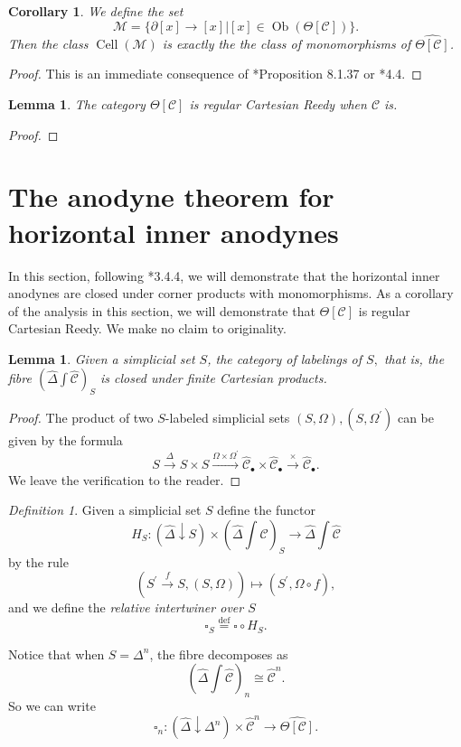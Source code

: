 \documentclass{amsart}
\numberwithin{equation}{section}
\theoremstyle{plain}   %
\newtheorem{cor}[subsection]{Corollary}
\newtheorem{lemma}[subsection]{Lemma}
\theoremstyle{remark}
\newtheorem{defn}[subsection]{Definition}
\theoremstyle{plain}
\DeclareMathOperator{\Ob}{Ob}
\newcommand{\overcat}[2]{{\left(#1\downarrow #2\right)}}
\newcommand{\psh}[1]{\ensuremath{\widehat{#1}}}
\newcommand{\C}{\ensuremath{\mathcal{C}}}
\newcommand{\defeq}{\overset{\mathrm{def}}=}
\newcommand{\cellset}{\ensuremath{\widehat{\Theta[\mathcal{C}]}}}
\newcommand{\ssetlab}{\ensuremath{\widehat{\Delta} \int \widehat{\mathcal{C}}}}
\begin{document}
\begin{cor} 
	We define the set
	\[\mathscr{M}=\{\partial[x] \to [x]| [x]\in \Ob(\Theta[\C])\}.\]  Then the class \(\operatorname{Cell}(\mathscr{M})\) is exactly the the class of monomorphisms of \(\cellset\).  
\end{cor}
\begin{proof}
	This is an immediate consequence of \cite{cisinski-book}*{Proposition 8.1.37} or \cite{bergner-rezk-reedy}*{4.4}.
\end{proof}
\begin{lemma} The category \(\Theta[\C]\) is regular Cartesian Reedy when \(\C\) is.
\end{lemma}
\begin{proof}
\end{proof}

\section{The anodyne theorem for horizontal inner anodynes}\label{horizontal}
In this section, following \cite{oury}*{3.4.4}, we will demonstrate that the horizontal inner anodynes are closed under corner products with monomorphisms.  As a corollary of the analysis in this section, we will demonstrate that \(\Theta[\C]\) is regular Cartesian Reedy.  We make no claim to originality.

\begin{lemma} Given a simplicial set \(S\), the category of labelings of \(S,\) that is, the fibre \(\left(\ssetlab\right)_S\) is closed under finite Cartesian products. 
\end{lemma}
\begin{proof} The product of two \(S\)-labeled simplicial sets \((S,\Omega), (S,\Omega^\prime)\) can be given by the formula 
	\[S\xrightarrow{\Delta} S\times S \xrightarrow{\Omega\times \Omega^\prime}  \psh{\C}_\bullet \times \psh{\C}_\bullet \xrightarrow{\times} \psh{\C}_\bullet.\]  We leave the verification to the reader.
\end{proof}

\begin{defn} Given a simplicial set \(S\) define the functor 
	\[H_S: \overcat{\psh{\Delta}}{S} \times  \left(\ssetlab\right)_S \to \ssetlab\]
	by the rule
	\[\left(S^\prime \xrightarrow{f} S, (S,\Omega)\right) \mapsto (S^\prime,  \Omega\circ f),\]
	and we define the \emph{relative intertwiner over \(S\)}
	\[\square_S \defeq \square \circ H_S.\]
	
	Notice that when \(S=\Delta^n\), the fibre decomposes as \[\left(\ssetlab\right)_n\cong \psh{\C}^n.\] So we can write 
	\[\square_n:\overcat{\psh{\Delta}}{\Delta^n} \times \psh{\C}^n \to \cellset.\]
\end{defn}
\end{document}
